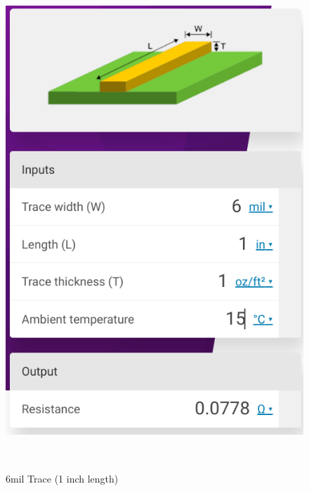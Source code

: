 \documentclass[a4paper,11pt]{article}%
\begin{document}
\begin{figure}[H]
\centering
\begin{minipage}[b]{0.45\linewidth}
	\includegraphics[scale=0.4]{figures/6}
	\caption{6mil Trace (1 inch length) }
\end{minipage}
\
\begin{minipage}[b]{0.45\linewidth}

\end{minipage}
\end{figure}
\end{document}
